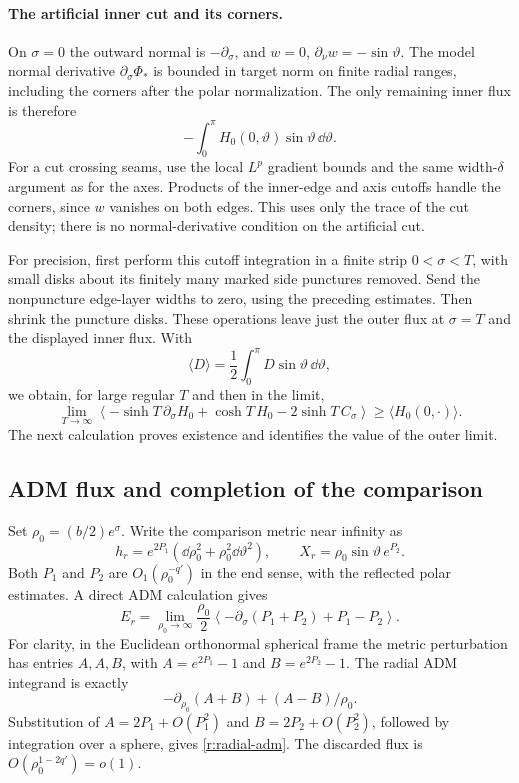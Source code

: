 \paragraph{The artificial inner cut and its corners.}
On $\sigma=0$ the outward normal is $-\partial_\sigma$, and
$w=0$, $\partial_\nu w=-\sin\vartheta$.  The model normal derivative
$\partial_\sigma\Phi_*$ is bounded in target norm on finite radial
ranges, including the corners after the polar normalization.  The only
remaining inner flux is therefore
\[
 -\int_0^\pi H_0(0,\vartheta)\sin\vartheta\,\dd\vartheta.
\]
For a cut crossing seams, use the local $L^p$ gradient bounds and the
same width-$\delta$ argument as for the axes.  Products of the inner-edge
and axis cutoffs handle the corners, since $w$ vanishes on both edges.
This uses only the trace of the cut density; there is no normal-derivative
condition on the artificial cut.

For precision, first perform this cutoff integration in a finite strip
$0<\sigma<T$, with small disks about its finitely many marked side
punctures removed.  Send the nonpuncture edge-layer widths to zero, using
the preceding estimates.  Then shrink the puncture disks.  These operations
leave just the outer flux at $\sigma=T$ and the displayed inner flux.
With
\[
 \langle D\rangle=\frac12\int_0^\pi D\sin\vartheta\,\dd\vartheta,
\]
we obtain, for large regular $T$ and then in the limit,
\begin{equation}\label{r:integrated-comparison}
 \lim_{T\to\infty}
 \left\langle-\sinh T\,\partial_\sigma H_0
       +\cosh T\,H_0-2\sinh T\,C_\sigma\right\rangle
 \ge \langle H_0(0,\cdot)\rangle.
\end{equation}
The next calculation proves existence and identifies the value of the
outer limit.

\subsection{ADM flux and completion of the comparison}
\label{r:adm}

Set $\rho_0=(b/2)e^\sigma$.  Write the comparison metric near infinity as
\[
 h_r=e^{2P_1}(\dd\rho_0^2+\rho_0^2\dd\vartheta^2),\qquad
 X_r=\rho_0\sin\vartheta\,e^{P_2}.
\]
Both $P_1$ and $P_2$ are $O_1(\rho_0^{-q'})$ in the end sense,
with the reflected polar estimates.  A direct ADM calculation gives
\begin{equation}\label{r:radial-adm}
 E_r=\lim_{\rho_0\to\infty}\frac{\rho_0}{2}
 \left\langle-\partial_\sigma(P_1+P_2)+P_1-P_2\right\rangle.
\end{equation}
For clarity, in the Euclidean orthonormal spherical frame the metric
perturbation has entries $A,A,B$, with
$A=e^{2P_1}-1$ and $B=e^{2P_2}-1$.
The radial ADM integrand is exactly
\[
 -\partial_{\rho_0}(A+B)+(A-B)/\rho_0.
\]
Substitution of $A=2P_1+O(P_1^2)$ and $B=2P_2+O(P_2^2)$, followed by
integration over a sphere, gives \eqref{r:radial-adm}.  The discarded
flux is $O(\rho_0^{1-2q'})=o(1)$.

